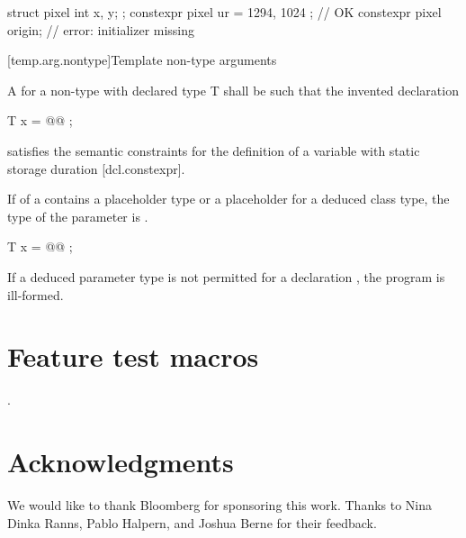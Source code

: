 \documentclass{wg21}
\begin{document}
\begin{example}
    \begin{codeblock}
        struct pixel {
            int x, y;
        };
        constexpr pixel ur = { 1294, 1024 };    // OK
        constexpr pixel origin;                 // error: initializer missing
    \end{codeblock}
\end{example}


[temp.arg.nontype]{Template non-type arguments}


\begin{addedblock}
A  for a non-type   with declared type T shall be such
that the invented declaration
\begin{codeblock}
    T x = @@ ;
\end{codeblock}
satisfies the semantic constraints for the definition of a  variable with static
storage duration [dcl.constexpr].
\end{addedblock}

\pnum
If   of a 
contains a placeholder type
or a placeholder for a deduced class type,
the type of the parameter is .
\begin{codeblock}
    T x = @@ ;
\end{codeblock}
If a deduced parameter type is not permitted
for a  declaration ,
the program is ill-formed.


\section{Feature test macros}

.


\section{Acknowledgments}

We would like to thank Bloomberg for sponsoring this work.
Thanks to Nina Dinka Ranns, Pablo Halpern, and Joshua Berne for their feedback.
\end{document}
